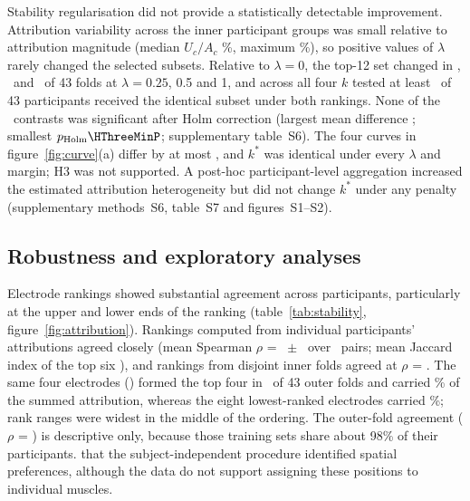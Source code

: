 Stability regularisation did not provide a statistically detectable improvement. Attribution variability across the inner participant groups was small relative to attribution magnitude (median $U_c/A_c$ \UOverAMedian\%, maximum \UOverAMax\%), so positive values of $\lambda$ rarely changed the selected subsets. Relative to $\lambda = 0$, the top-12 set changed in \TopTwelveDiffersLambdaPtTwoFive, \TopTwelveDiffersLambdaPtFive\ and \TopTwelveDiffersLambdaOne\ of 43 folds at $\lambda = 0.25$, 0.5 and 1, and across all four $k$ tested at least \HThreeMinTied\ of 43 participants received the identical subset under both rankings. None of the \HThreeNTests\ contrasts was significant after Holm correction (largest mean difference \HThreeMaxAbsDiff; smallest $p_{\mathrm{Holm}} \HThreeMinP$; supplementary table~S6). The four curves in figure~\ref{fig:curve}(a) differ by at most \LambdaCurveMaxSpread, and $k^*$ was identical under every $\lambda$ and margin; H3 was not supported. A post-hoc participant-level aggregation increased the estimated attribution heterogeneity but did not change $k^*$ under any penalty (supplementary methods~S6, table~S7 and figures~S1--S2).

\subsection[Robustness and exploratory analyses]{Robustness and exploratory analyses}
\label{sec:res_exploratory}

Electrode rankings showed substantial agreement across participants, particularly at the upper and lower ends of the ranking (table~\ref{tab:stability}, figure~\ref{fig:attribution}). Rankings computed from individual participants' attributions agreed closely (mean Spearman $\rho$ = \StabSubjRho\ $\pm$ \StabSubjRhoSD\ over \StabSubjPairs\ pairs; mean Jaccard index of the top six \StabSubjJacSix), and rankings from disjoint inner folds agreed at $\rho$ = \StabInnerRho. The same four electrodes (\TopFourSet) formed the top four in \TopFourFolds\ of 43 outer folds and carried \TopFourShare\% of the summed attribution, whereas the eight lowest-ranked electrodes carried \BottomEightShare\%; rank ranges were widest in the middle of the ordering. The outer-fold agreement ($\rho$ = \StabOuterRho) is descriptive only, because those training sets share about 98\% of their participants.  that the subject-independent procedure identified  spatial preferences, although the data do not support assigning these positions to individual muscles.

